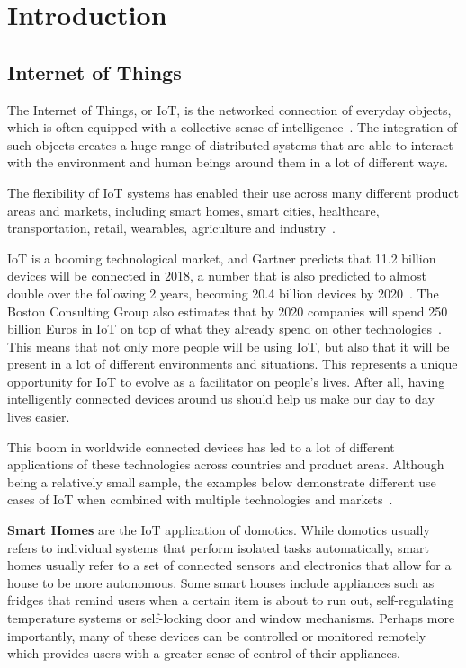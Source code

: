 \documentclass[runningheads]{llncs}
\begin{document}
\section{Introduction}

\subsection{Internet of Things}

The Internet of Things, or IoT, is the networked connection of everyday objects, which is often equipped with a collective sense of intelligence~\cite{Xia2012}. The integration of such objects creates a huge range of distributed systems that are able to interact with the environment and human beings around them in a lot of different ways.

The flexibility of IoT systems has enabled their use across many different product areas and markets, including smart homes, smart cities, healthcare, transportation, retail, wearables, agriculture and industry~\cite{Rahul2017}.

IoT is a booming technological market, and Gartner predicts that 11.2 billion devices will be connected in 2018, a number that is also predicted to almost double over the following 2 years, becoming 20.4 billion devices by 2020~\cite{VanderMeulen2017}. The Boston Consulting Group also estimates that by 2020 companies will spend 250 billion Euros in IoT on top of what they already spend on other technologies~\cite{Hunke2017}. This means that not only more people will be using IoT, but also that it will be present in a lot of different environments and situations. This represents a unique opportunity for IoT to evolve as a facilitator on people’s lives. After all, having intelligently connected devices around us should help us make our day to day lives easier.

This boom in worldwide connected devices has led to a lot of different applications of these technologies across countries and product areas. Although being a relatively small sample, the examples below demonstrate different use cases of IoT when combined with multiple technologies and markets~\cite{Chen2014,Lee2015,Xu2014}.

\textbf{Smart Homes} are the IoT application of domotics. While domotics usually refers to individual systems that perform isolated tasks automatically, smart homes usually refer to a set of connected sensors and electronics that allow for a house to be more autonomous. Some smart houses include appliances such as fridges that remind users when a certain item is about to run out, self-regulating temperature systems or self-locking door and window mechanisms. Perhaps more importantly, many of these devices can be controlled or monitored remotely which provides users with a greater sense of control of their appliances.
\end{document}
